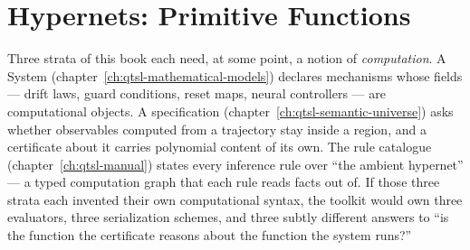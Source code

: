 \chapter{Hypernets: Primitive Functions}
\label{ch:qtsl-hypernets}

\newcommand{\primentry}[2]{%
  \par\bigskip
  \phantomsection\label{prim:#2}%
  \noindent{\bfseries #1}\hfill
  {\footnotesize\textcolor{NoteGray}{Primitive Catalogue entry \texttt{#2}}}%
  \par\nopagebreak\smallskip}
\newcommand{\primmeta}{%
  \par\nopagebreak{\small\bfseries The row (Computer Science Metanotation)}\par\nopagebreak\smallskip}

\noindent\draftmark\medskip

Three strata of this book each need, at some point, a notion of
\emph{computation}. A System (chapter~\ref{ch:qtsl-mathematical-models})
declares mechanisms whose fields --- drift laws, guard conditions,
reset maps, neural controllers --- are computational objects. A
specification (chapter~\ref{ch:qtsl-semantic-universe}) asks whether
observables computed from a trajectory stay inside a region, and a
certificate about it carries polynomial content of its own. The rule
catalogue (chapter~\ref{ch:qtsl-manual}) states every inference rule
over ``the ambient hypernet'' --- a typed computation graph that each
rule reads facts out of. If those three strata each invented their own
computational syntax, the toolkit would own three evaluators, three
serialization schemes, and three subtly different answers to ``is the
function the certificate reasons about the function the system runs?''

